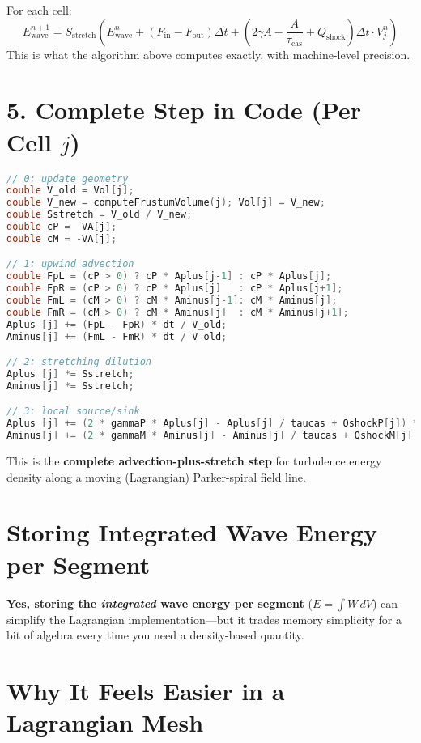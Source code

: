 For each cell:
\[
E^{n+1}_{\text{wave}} = S_{\text{stretch}} \left( E^n_{\text{wave}}
+ (F_{\text{in}} - F_{\text{out}}) \Delta t
+ \left(2\gamma A - \frac{A}{\tau_{\text{cas}}} + Q_{\text{shock}}\right) \Delta t \cdot V_j^n \right)
\]
This is what the algorithm above computes exactly, with machine-level precision.

\section*{5. Complete Step in Code (Per Cell $j$)}

\begin{lstlisting}[language=C++,basicstyle=\ttfamily\footnotesize]
// 0: update geometry
double V_old = Vol[j];
double V_new = computeFrustumVolume(j); Vol[j] = V_new;
double Sstretch = V_old / V_new;
double cP =  VA[j];
double cM = -VA[j];

// 1: upwind advection
double FpL = (cP > 0) ? cP * Aplus[j-1] : cP * Aplus[j];
double FpR = (cP > 0) ? cP * Aplus[j]   : cP * Aplus[j+1];
double FmL = (cM > 0) ? cM * Aminus[j-1]: cM * Aminus[j];
double FmR = (cM > 0) ? cM * Aminus[j]  : cM * Aminus[j+1];
Aplus [j] += (FpL - FpR) * dt / V_old;
Aminus[j] += (FmL - FmR) * dt / V_old;

// 2: stretching dilution
Aplus [j] *= Sstretch;
Aminus[j] *= Sstretch;

// 3: local source/sink
Aplus [j] += (2 * gammaP * Aplus[j] - Aplus[j] / taucas + QshockP[j]) * dt;
Aminus[j] += (2 * gammaM * Aminus[j] - Aminus[j] / taucas + QshockM[j]) * dt;
\end{lstlisting}

\noindent This is the \textbf{complete advection-plus-stretch step} for turbulence energy density along a moving (Lagrangian) Parker-spiral field line.

\section*{Storing Integrated Wave Energy per Segment}

\textbf{Yes, storing the \emph{integrated} wave energy per segment} ($E = \int W\,dV$) can simplify the Lagrangian implementation—but it trades memory simplicity for a bit of algebra every time you need a density-based quantity.

\section*{Why It Feels Easier in a Lagrangian Mesh}

